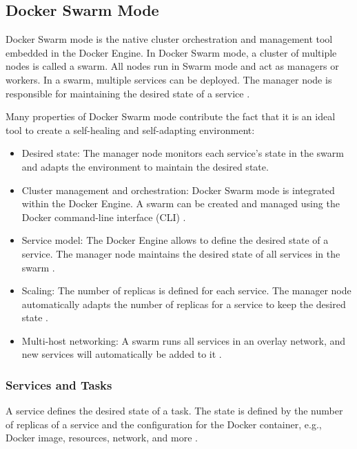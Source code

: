 \subsection{Docker Swarm Mode}
\label{subsec:04_docker_swarm}
Docker Swarm mode is the native cluster orchestration and management tool embedded in the Docker Engine.
In Docker Swarm mode, a cluster of multiple nodes is called a swarm. All nodes run in Swarm mode and act as managers or workers.
In a swarm, multiple services can be deployed. The manager node is responsible for maintaining the desired state of a service \cite{Docker2020Docs}.


% 
Many properties of Docker Swarm mode contribute the fact that it is an ideal tool to create a self-healing and self-adapting environment:
\begin{itemize}
\item Desired state: The manager node monitors each service's state in the swarm and adapts the environment to maintain the desired state\cite{Docker2020Docs}.

\item Cluster management and orchestration: Docker Swarm mode is integrated within the Docker Engine. A swarm can be created and managed using the Docker command-line interface (CLI) \cite{Docker2020Docs}.

\item Service model: The Docker Engine allows to define the desired state of a service. The manager node maintains the desired state of all services in the swarm \cite{Docker2020Docs}.

\item Scaling: The number of replicas is defined for each service. The manager node automatically adapts the number of replicas for a service to keep the desired state \cite{Docker2020Docs}.

\item Multi-host networking: A swarm runs all services in an overlay network, and new services will automatically be added to it \cite{Docker2020Docs}.
\end{itemize}


\subsubsection{Services and Tasks}
A service defines the desired state of a task. The state is defined by the number of replicas of a service and the configuration for the Docker container, e.g., Docker image, resources, network, and more \cite{Docker2020Docs}.


